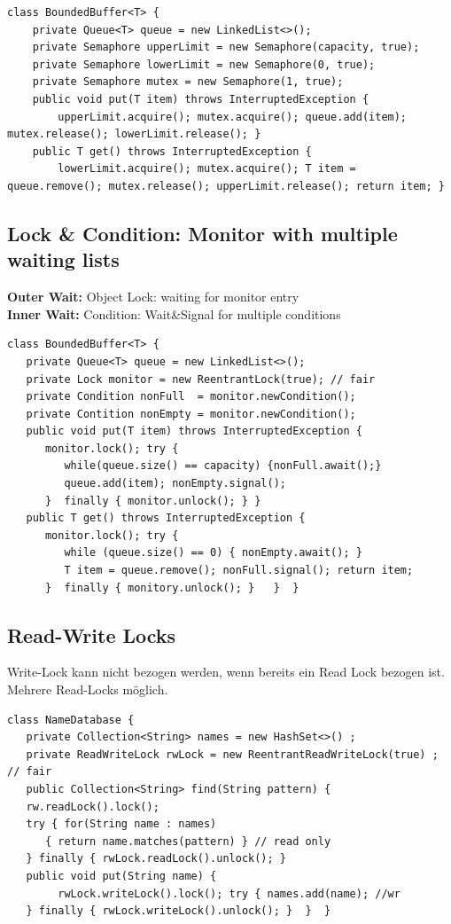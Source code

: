 \begin{lstlisting}[style=java]
class BoundedBuffer<T> {
	private Queue<T> queue = new LinkedList<>();
	private Semaphore upperLimit = new Semaphore(capacity, true);
	private Semaphore lowerLimit = new Semaphore(0, true);
	private Semaphore mutex = new Semaphore(1, true);
	public void put(T item) throws InterruptedException {
		upperLimit.acquire(); mutex.acquire(); queue.add(item); mutex.release(); lowerLimit.release(); }
	public T get() throws InterruptedException {
		lowerLimit.acquire(); mutex.acquire(); T item = queue.remove(); mutex.release(); upperLimit.release(); return item; }
\end{lstlisting}

\subsection{Lock \& Condition: Monitor with multiple waiting lists}
\textbf{Outer Wait:} Object Lock: waiting for monitor entry \\
\textbf{Inner Wait:} Condition: Wait\&Signal for multiple conditions

\begin{lstlisting}[style=java]
  class BoundedBuffer<T> {
   private Queue<T> queue = new LinkedList<>();
   private Lock monitor = new ReentrantLock(true); // fair
   private Condition nonFull  = monitor.newCondition();
   private Contition nonEmpty = monitor.newCondition();
   public void put(T item) throws InterruptedException { 
      monitor.lock(); try {
         while(queue.size() == capacity) {nonFull.await();}
         queue.add(item); nonEmpty.signal();
      }  finally { monitor.unlock(); } }
   public T get() throws InterruptedException {
      monitor.lock(); try {
         while (queue.size() == 0) { nonEmpty.await(); } 
         T item = queue.remove(); nonFull.signal(); return item;
      }  finally { monitory.unlock(); }   }  }
\end{lstlisting}

\subsection{Read-Write Locks}
Write-Lock kann nicht bezogen werden, wenn bereits ein Read Lock bezogen ist. Mehrere Read-Locks möglich.

\begin{lstlisting}[style=java]
class NameDatabase {
   private Collection<String> names = new HashSet<>() ;
   private ReadWriteLock rwLock = new ReentrantReadWriteLock(true) ; // fair
   public Collection<String> find(String pattern) { 
   rw.readLock().lock(); 
   try { for(String name : names) 
      { return name.matches(pattern) } // read only
   } finally { rwLock.readLock().unlock(); }
   public void put(String name) { 
   		rwLock.writeLock().lock(); try { names.add(name); //wr
   } finally { rwLock.writeLock().unlock(); }  }  }	
\end{lstlisting}

